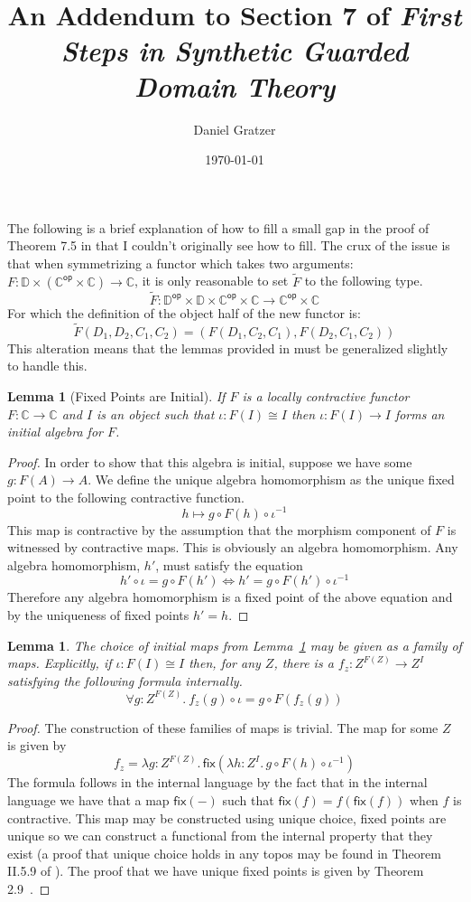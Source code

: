 \documentclass{amsart}
\title{An Addendum to Section 7 of \emph{First Steps in Synthetic
    Guarded Domain Theory}}
\author{Daniel Gratzer}
\date{\today}
\newtheorem{lem}[thm]{Lemma}
\newcommand{\Ccat}{\ensuremath{\mathbb{C}}}
\newcommand{\Dcat}{\ensuremath{\mathbb{D}}}
\newcommand{\op}[1]{\ensuremath{#1^{\mathsf{op}}}}
\newcommand{\symmetrize}[1]{\ensuremath{\widetilde{#1}}}
\newcommand{\fix}[1]{\ensuremath{\mathsf{fix}(#1)}}
\newcommand{\lam}[2]{\ensuremath{\lambda #1.\,#2}}
\begin{document}
\maketitle

The following is a brief explanation of how to fill a small gap in the
proof of Theorem 7.5 in \citet{Birkedal:11} that I couldn't originally
see how to fill. The crux of the issue is that when symmetrizing a
functor which takes two arguments:
$F : \Dcat \times (\op{\Ccat} \times \Ccat) \to \Ccat$, it is only
reasonable to set $\symmetrize{F}$ to the following type.
\[
  \symmetrize{F} : \op{\Dcat} \times \Dcat \times \op{\Ccat} \times \Ccat \to \op{\Ccat} \times \Ccat
\]
For which the definition of the object half of the new functor is:
\[
  \symmetrize{F}(D_1, D_2, C_1, C_2) = (F(D_1, C_2, C_1), F(D_2, C_1, C_2))
\]
This alteration means that the lemmas provided in \citet{Birkedal:11}
must be generalized slightly to handle this.
\begin{lem}[Fixed Points are Initial]\label{lem:initial}
  If $F$ is a locally contractive functor $F : \Ccat \to \Ccat$ and
  $I$ is an object such that $\iota : F(I) \cong I$ then
  $\iota : F(I) \to I$ forms an initial algebra for $F$.
\end{lem}
\begin{proof}
  In order to show that this algebra is initial, suppose we have some
  $g : F(A) \to A$. We define the unique algebra homomorphism as the
  unique fixed point to the following contractive function.
  \[
    h \mapsto g \circ F(h) \circ \iota^{-1}
  \]
  This map is contractive by the assumption that the morphism
  component of $F$ is witnessed by contractive maps. This is obviously
  an algebra homomorphism. Any algebra homomorphism, $h'$, must
  satisfy the equation
  \[
    h' \circ \iota = g \circ F(h') \iff
    h' = g \circ F(h') \circ \iota^{-1}
  \]
  Therefore any algebra homomorphism is a fixed point of the above
  equation and by the uniqueness of fixed points $h' = h$.
\end{proof}
\begin{lem}\label{lem:internal-choice}
  The choice of initial maps from Lemma~\ref{lem:initial} may be given
  as a family of maps. Explicitly, if $\iota : F(I) \cong I$ then, for
  any $Z$, there is a $f_z : Z^{F(Z)} \to Z^I$ satisfying the
  following formula internally.
  \[
    \forall g : Z^{F(Z)}.\ f_z(g) \circ \iota = g \circ F(f_z(g))
  \]
\end{lem}
\begin{proof}
  The construction of these families of maps is trivial. The map for some
  $Z$ is given by
  \[
    f_z = \lam{g : Z^{F(Z)}}{\fix{\lam{h : Z^I}{g \circ F(h) \circ \iota^{-1}}}}
  \]
  The formula follows in the internal language by the fact that in the internal language we have
  that a map $\fix{-}$ such that $\fix{f} = f(\fix{f})$ when $f$ is contractive. This map may be
  constructed using unique choice, fixed points are unique so we can construct a functional from the
  internal property that they exist (a proof that unique choice holds in any topos may be found in
  Theorem II.5.9 of \citet{Lambek:88}). The proof that we have unique fixed points is given by
  Theorem 2.9~\citep{Birkedal:11}.
\end{proof}
\end{document}
